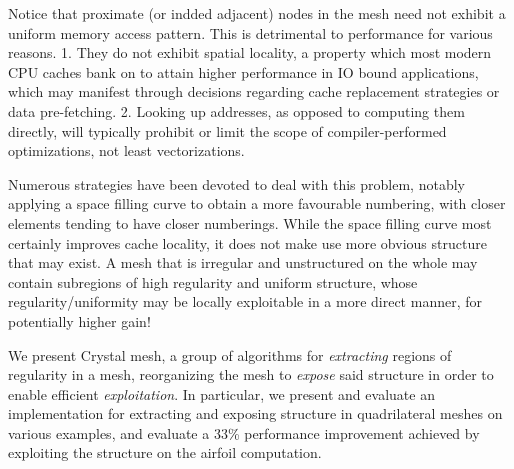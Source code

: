 Notice that proximate (or indded adjacent) nodes in the mesh need not exhibit a uniform memory access pattern. This is detrimental to performance for various reasons.
1. They do not exhibit spatial locality, a property which most modern CPU caches bank on to attain higher performance in IO bound applications, which may manifest through decisions regarding cache replacement strategies or data pre-fetching.
2. Looking up addresses, as opposed to computing them directly, will typically prohibit or limit the scope of compiler-performed optimizations, not least vectorizations.

Numerous strategies have been devoted to deal with this problem, notably applying a space filling curve to obtain a more favourable numbering, with closer elements tending to have closer numberings. While the space filling curve most certainly improves cache locality, it does not make use more obvious structure that may exist. A mesh that is irregular and unstructured on the whole may contain subregions of high regularity and uniform structure, whose regularity/uniformity may be locally exploitable in a more direct manner, for potentially higher gain!


We present Crystal mesh, a group of algorithms for \emph{extracting} regions of regularity in a mesh, reorganizing the mesh to \emph{expose} said structure in order to enable efficient \emph{exploitation}.
In particular, we present and evaluate an implementation for extracting and exposing structure in quadrilateral meshes on various examples, and evaluate a 33\% performance improvement achieved by exploiting the structure on the airfoil computation.
